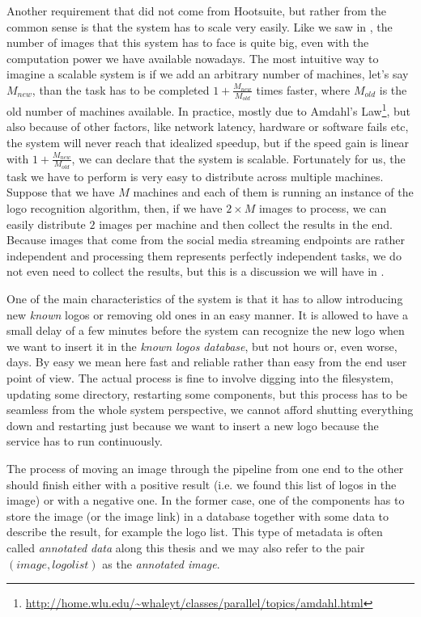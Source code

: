 Another requirement that did not come from Hootsuite, but rather from the
common sense is that the system has to scale very easily. Like we saw in
, the number of images that this
system has to face is quite big, even with the computation power we have
available nowadays. The most intuitive way to imagine a scalable system is if
we add an arbitrary number of machines, let's say \(M_{new}\), than the task
has to be completed \(1 + \frac{M_{new}}{M_{old}}\) times faster, where \(M_{old}\) is the old number
of machines available. In practice, mostly due to Amdahl's
Law\footnote{\url{http://home.wlu.edu/~whaleyt/classes/parallel/topics/amdahl.html}},
but also because of other factors, like network latency, hardware or software
fails etc, the system will never reach that idealized speedup, but if the
speed gain is linear with \(1 + \frac{M_{new}}{M_{old}}\), we can declare that the
system is scalable. Fortunately for us, the task we have to perform is very
easy to distribute across multiple machines. Suppose that we have \(M\)
machines and each of them is running an instance of the logo recognition
algorithm, then, if we have \(2 \times M\) images to process, we can easily
distribute \(2\) images per machine and then collect the results in the end.
Because images that come from the social media streaming endpoints are rather
independent and processing them represents perfectly independent tasks, we do
not even need to collect the results, but this is a discussion we will have in
.

One of the main characteristics of the system is that it has to allow
introducing new \textit{known} logos or removing old ones in an easy manner.
It is allowed to have a small delay of a few minutes before the system can
recognize the new logo when we want to insert it
in the \textit{known logos database}, but not hours or, even worse,
days. By easy we mean here fast and reliable rather than easy from the end user point of
view. The actual process is fine to involve digging into the filesystem,
updating some directory, restarting some components, but this process has to
be seamless from the whole system perspective, we cannot afford shutting
everything down and restarting just because we want to insert a new logo
because the service has to run continuously.

The process of moving an image through the pipeline from one end to the other
should finish either with a positive result (i.e. we found this list of logos
in the image) or with a negative one. In the former case, one of the
components has to store the image (or the image link) in a database together
with some data to describe the result, for example the logo list. This type of
metadata is often called \textit{annotated data} along this thesis and we may
also refer to the pair \((image, logo list)\) as the \textit{annotated
image}.

